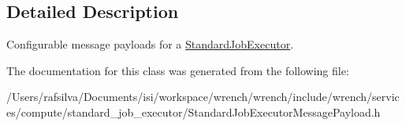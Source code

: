 \subsection{Detailed Description}
Configurable message payloads for a \hyperlink{classwrench_1_1_standard_job_executor}{Standard\+Job\+Executor}. 

The documentation for this class was generated from the following file\+:\begin{DoxyCompactItemize}
\item 
/\+Users/rafsilva/\+Documents/isi/workspace/wrench/wrench/include/wrench/services/compute/standard\+\_\+job\+\_\+executor/Standard\+Job\+Executor\+Message\+Payload.\+h\end{DoxyCompactItemize}
